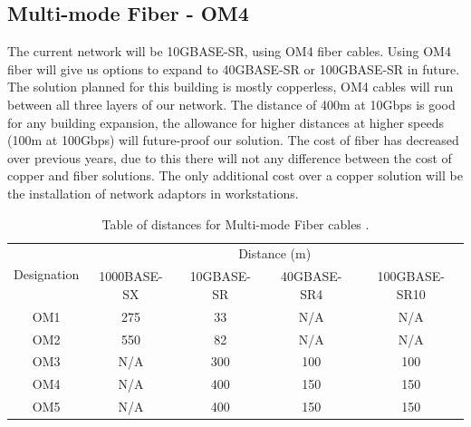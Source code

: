 \subsection{Multi-mode Fiber - OM4}
The current network will be 10GBASE-SR, using OM4 fiber cables. Using OM4 fiber will give us options to expand to 40GBASE-SR or 100GBASE-SR in future.
The solution planned for this building is mostly copperless, OM4 cables will run between all three layers of our network.
The distance of 400m at 10Gbps is good for any building expansion, the allowance for higher distances at higher speeds (100m at 100Gbps) will future-proof our solution.
The cost of fiber has decreased over previous years, due to this there will not any difference between the cost of copper and fiber solutions. The only additional cost over a copper solution will be the installation of network adaptors in workstations.
\begin{table}[H]
    \centering
    \begin{tabular}{|ccccc|}
    \hline
    \multicolumn{1}{|c|}{\multirow{2}{*}{Designation}} & \multicolumn{4}{c|}{Distance (m)}                                                                                \\ \cline{2-5} 
    \multicolumn{1}{|c|}{}                             & \multicolumn{1}{c|}{1000BASE-SX} & \multicolumn{1}{c|}{10GBASE-SR} & \multicolumn{1}{c|}{40GBASE-SR4} & 100GBASE-SR10 \\ \hline
    OM1                                                & 275                            & 33                              & N/A                             & N/A         \\ \hline
    OM2                                                & 550                            & 82                              & N/A                             & N/A         \\ \hline
    OM3                                                & N/A                            & 300                             & 100                             & 100         \\ \hline
    OM4                                                & N/A                            & 400                             & 150                             & 150         \\ \hline
    OM5                                                & N/A                            & 400                             & 150                             & 150         \\ \hline
    \end{tabular}
    \caption{Table of distances for Multi-mode Fiber cables \parencite{mm-fiber-stats}.}
    \label{tab:fiber_distance}
\end{table}

